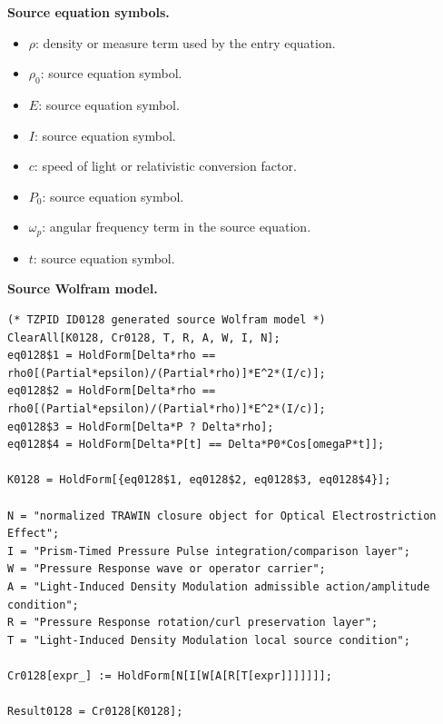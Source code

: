 \begin{minipage}[t]{0.49\linewidth}
\begingroup
\small
\raggedright
\textbf{Source equation symbols.}\par
\begin{itemize}[leftmargin=1.35em,itemsep=1pt,topsep=1pt,parsep=0pt]
    \item $\rho$: density or measure term used by the entry equation.
    \item $\rho_0$: source equation symbol.
    \item $E$: source equation symbol.
    \item $I$: source equation symbol.
    \item $c$: speed of light or relativistic conversion factor.
    \item $P_0$: source equation symbol.
    \item $\omega_p$: angular frequency term in the source equation.
    \item $t$: source equation symbol.
\end{itemize}
\endgroup
\end{minipage}\hfill
\begin{minipage}[t]{0.47\linewidth}
\begingroup
\scriptsize
\raggedright
\textbf{Source Wolfram model.}\par
\begin{Verbatim}[fontsize=\tiny,breaklines=true,breakanywhere=true]
(* TZPID ID0128 generated source Wolfram model *)
ClearAll[K0128, Cr0128, T, R, A, W, I, N];
eq0128$1 = HoldForm[Delta*rho == rho0[(Partial*epsilon)/(Partial*rho)]*E^2*(I/c)];
eq0128$2 = HoldForm[Delta*rho == rho0[(Partial*epsilon)/(Partial*rho)]*E^2*(I/c)];
eq0128$3 = HoldForm[Delta*P ? Delta*rho];
eq0128$4 = HoldForm[Delta*P[t] == Delta*P0*Cos[omegaP*t]];

K0128 = HoldForm[{eq0128$1, eq0128$2, eq0128$3, eq0128$4}];

N = "normalized TRAWIN closure object for Optical Electrostriction Effect";
I = "Prism-Timed Pressure Pulse integration/comparison layer";
W = "Pressure Response wave or operator carrier";
A = "Light-Induced Density Modulation admissible action/amplitude condition";
R = "Pressure Response rotation/curl preservation layer";
T = "Light-Induced Density Modulation local source condition";

Cr0128[expr_] := HoldForm[N[I[W[A[R[T[expr]]]]]]];

Result0128 = Cr0128[K0128];
\end{Verbatim}
\endgroup
\end{minipage}


